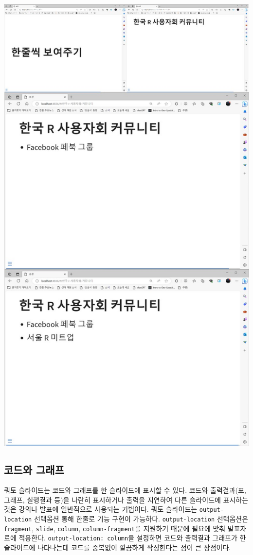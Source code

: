 \documentclass[
  letterpaper,
]{book}
\begin{document}
\includegraphics{images/revealjs_incremental.jpg}

\hypertarget{uxcf54uxb4dcuxc640-uxadf8uxb798uxd504}{%
\subsection{코드와 그래프}\label{uxcf54uxb4dcuxc640-uxadf8uxb798uxd504}}

쿼토 슬라이드는 코드와 그래프를 한 슬라이드에 표시할 수 있다. 코드와
출력결과(표, 그래프, 실행결과 등)을 나란히 표시하거나 출력을 지연하여
다른 슬라이드에 표시하는 것은 강의나 발표에 일반적으로 사용되는
기법이다. 쿼토 슬라이드는 \texttt{output-location} 선택옵션 통해 한줄로
기능 구현이 가능하다. \texttt{output-location} 선택옵션은
\texttt{fragment}, \texttt{slide}, \texttt{column},
\texttt{column-fragment}를 지원하기 때문에 필요에 맞춰 발표자료에
적용한다. \texttt{output-location:\ column}을 설정하면 코드와 출력결과
그래프가 한 슬라이드에 나타나는데 코드를 중복없이 깔끔하게 작성한다는
점이 큰 장점이다.
\end{document}
